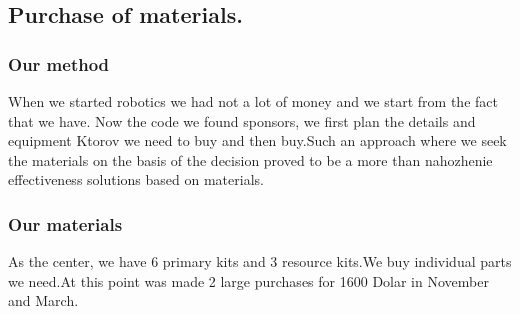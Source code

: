 	\subsection{Purchase of materials.}
		\subsubsection{Our method}
		When we started robotics we had not a lot of money and we start from the fact that we have. Now the code we found sponsors, we first plan the details and equipment Ktorov we need to buy and then buy.Such an approach where we seek the materials on the basis of the decision proved to be a more than nahozhenie effectiveness solutions based on materials.
		\subsubsection{Our materials}
		As the center, we have 6 primary kits and 3 resource kits.We buy individual parts we need.At this point was made 2 large purchases for 1600 Dolar in November and March.
\newpage	